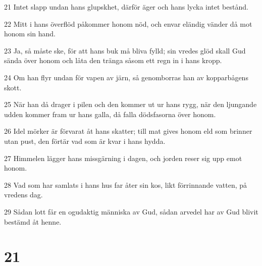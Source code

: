 \par 21 Intet slapp undan hans glupskhet, därför äger och hans lycka intet bestånd.
\par 22 Mitt i hans överflöd påkommer honom nöd, och envar eländig vänder då mot honom sin hand.
\par 23 Ja, så måste ske, för att hans buk må bliva fylld; sin vredes glöd skall Gud sända över honom och låta den tränga såsom ett regn in i hans kropp.
\par 24 Om han flyr undan för vapen av järn, så genomborras han av kopparbågens skott.
\par 25 När han då drager i pilen och den kommer ut ur hans rygg, när den ljungande udden kommer fram ur hans galla, då falla dödsfasorna över honom.
\par 26 Idel mörker är förvarat åt hans skatter; till mat gives honom eld som brinner utan pust, den förtär vad som är kvar i hans hydda.
\par 27 Himmelen lägger hans missgärning i dagen, och jorden reser sig upp emot honom.
\par 28 Vad som har samlats i hans hus far åter sin kos, likt förrinnande vatten, på vredens dag.
\par 29 Sådan lott får en ogudaktig människa av Gud, sådan arvedel har av Gud blivit bestämd åt henne.

\chapter{21}

